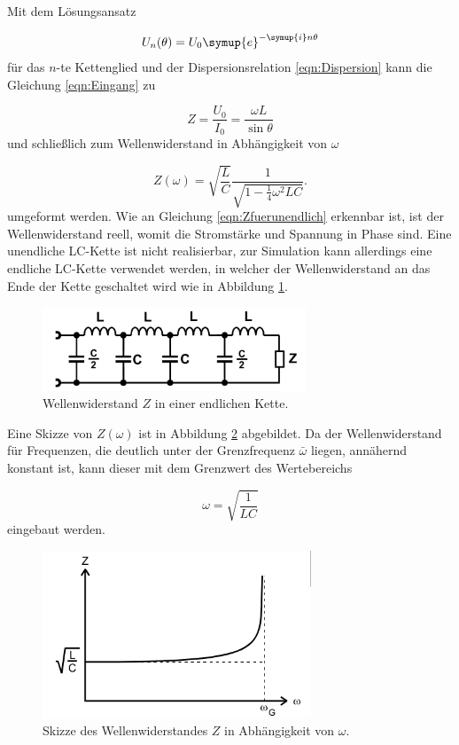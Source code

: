 Mit dem Lösungsansatz

\begin{equation}
  U_n(\theta) = U_0 \symup{e}^{-\symup{i}n\theta}
\end{equation}
für das $n$-te Kettenglied und der Dispersionsrelation \eqref{eqn:Dispersion}
kann die Gleichung \eqref{eqn:Eingang} zu

\begin{equation}
  Z = \frac{U_0}{I_0} = \frac{\omega L}{\sin \theta}
\end{equation}
und schließlich zum Wellenwiderstand in Abhängigkeit von $\omega$

\begin{equation}
  Z(\omega) = \sqrt{\frac{L}{C}} \frac{1}{\sqrt{1-\frac{1}{4}\omega^2 LC}}.
  \label{eqn:Zfuerunendlich}
\end{equation}
umgeformt werden.
Wie an Gleichung \eqref{eqn:Zfuerunendlich} erkennbar ist, ist der
Wellenwiderstand reell, womit die Stromstärke und Spannung in Phase sind.
Eine unendliche LC-Kette ist nicht realisierbar, zur Simulation kann
allerdings eine endliche LC-Kette verwendet werden, in welcher der
Wellenwiderstand an das Ende der Kette geschaltet wird wie in Abbildung
\ref{fig:endK}.

\begin{figure}
  \centering
  \includegraphics[height = 2.5cm]{endlicheWelle.png}
  \caption{Wellenwiderstand $Z$ in einer endlichen Kette.}
  \label{fig:endK}
\end{figure}

Eine Skizze von $Z(\omega)$ ist in Abbildung \ref{fig:WO} abgebildet. Da der
Wellenwiderstand für Frequenzen, die deutlich unter der Grenzfrequenz
$\bar{\omega}$ liegen, annähernd konstant ist, kann dieser mit dem Grenzwert
des Wertebereichs

\begin{equation}
  \omega = \sqrt{\frac{1}{LC}}
\end{equation}
eingebaut werden.

\begin{figure}
  \centering
  \includegraphics[height = 5cm]{WiderstandOmega.png}
  \caption{Skizze des Wellenwiderstandes $Z$ in Abhängigkeit von $\omega$.}
  \label{fig:WO}
\end{figure}


